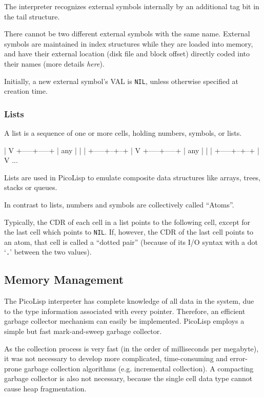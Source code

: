 The interpreter recognizes external symbols internally by an additional
tag bit in the tail structure.

There cannot be two different external symbols with the same name.
External symbols are maintained in index structures while they are
loaded into memory, and have their external location (disk file and
block offset) directly coded into their names (more details
\emph{here}).

Initially, a new external symbol's VAL is \texttt{NIL}, unless otherwise
specified at creation time.

 
\subsubsection{Lists}
\label{sec:refm-lists}%
A list is a sequence of one or more cells, holding numbers, symbols, or
lists.


\begin{wideverbatim}
|
V
+-----+-----+
| any |  |  |
+-----+--+--+
         |
         V
         +-----+-----+
         | any |  |  |
         +-----+--+--+
                  |
                  V
                  ...
\end{wideverbatim}

Lists are used in PicoLisp to emulate composite data structures like
arrays, trees, stacks or queues.

In contrast to lists, numbers and symbols are collectively called
``Atoms''.

Typically, the CDR of each cell in a list points to the following cell,
except for the last cell which points to \texttt{NIL}. If, however, the CDR of
the last cell points to an atom, that cell is called a ``dotted pair''
(because of its I/O syntax with a dot `\texttt{.}' between the two values).

\subsection{Memory Management}
\label{sec:refm-memory-management}


The PicoLisp interpreter has complete knowledge of all data in the
system, due to the type information associated with every pointer.
Therefore, an efficient garbage collector mechanism can easily be
implemented. PicoLisp employs a simple but fast mark-and-sweep garbage
collector.

As the collection process is very fast (in the order of milliseconds per
megabyte), it was not necessary to develop more complicated,
time-consuming and error-prone garbage collection algorithms (e.g.
incremental collection). A compacting garbage collector is also not
necessary, because the single cell data type cannot cause heap
fragmentation.

